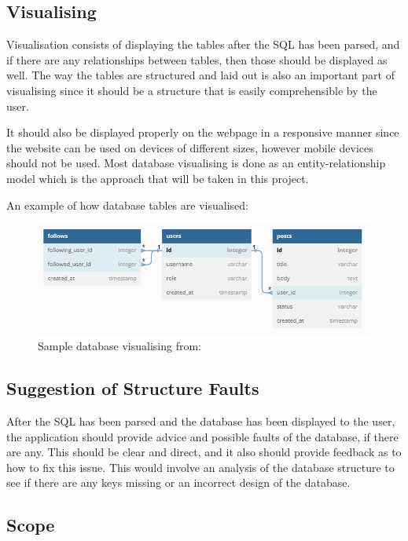 \newpage

\subsection{Visualising} 

Visualisation consists of displaying the tables after the SQL has been parsed, and if there are any relationships between tables, then those should be displayed as well. The way the tables are structured and laid out is also an important part of visualising since it should be a structure that is easily comprehensible by the user. 

It should also be displayed properly on the webpage in a responsive manner since the website can be used on devices of different sizes, however mobile devices should not be used. Most database visualising is done as an entity-relationship model which is the approach that will be taken in this project.

An example of how database tables are visualised:
\begin{figure}[h!]
	\centering
	\includegraphics[width=\textwidth]{dbdiagram}
	\caption{Sample database visualising from: \cite{dbdiagram}}
	\label{fig:dbdiagram}
\end{figure}

\subsection{Suggestion of Structure Faults}

After the SQL has been parsed and the database has been displayed to the user, the application should provide advice and possible faults of the database, if there are any. This should be clear and direct, and it also should provide feedback as to how to fix this issue. This would involve an analysis of the database structure to see if there are any keys missing or an incorrect design of the database.

\subsection{Scope}
\label{subsec:scope}

